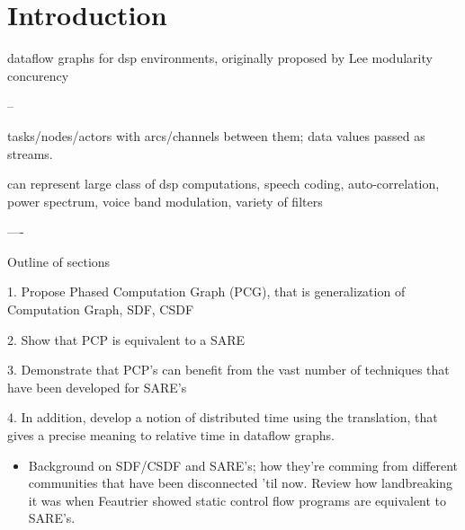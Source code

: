 \section{Introduction}



dataflow graphs for dsp environments, originally proposed by Lee
modularity
concurency

--

tasks/nodes/actors with arcs/channels between them; data values passed as streams.

can represent large class of dsp computations, speech coding,
auto-correlation, power spectrum, voice band modulation, variety of filters

----

Outline of sections

1. Propose Phased Computation Graph (PCG), that is generalization of
   Computation Graph, SDF, CSDF

2. Show that PCP is equivalent to a SARE 

3. Demonstrate that PCP's can benefit from the vast number of
   techniques that have been developed for SARE's

4. In addition, develop a notion of distributed time using the
   translation, that gives a precise meaning to relative time in
   dataflow graphs.


\begin{itemize}

\item Background on SDF/CSDF and SARE's; how they're comming from
different communities that have been disconnected 'til now.  Review
how landbreaking it was when Feautrier showed static control flow
programs are equivalent to SARE's.

\end{itemize}
